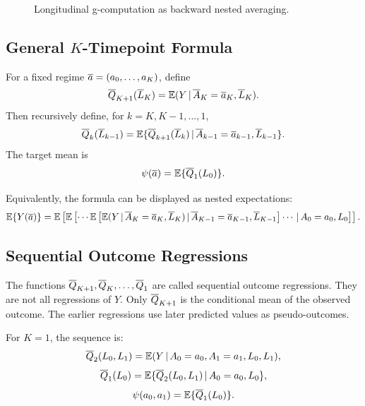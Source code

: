 \begin{figure}[H]
\centering
{}
\caption{Longitudinal g-computation as backward nested averaging.}
\label{fig:ch8-gcomp-nesting}
\end{figure}

\subsection{General $K$-Timepoint Formula}

For a fixed regime $\overline{a}=(a_0,\ldots,a_K)$, define
\[
  \overline{Q}_{K+1}(\overline{L}_K)
  =
  \mathbb{E}(Y\,\vert\, \overline{A}_K=\overline{a}_K,\overline{L}_K).
\]
Then recursively define, for $k=K,K-1,\ldots,1$,
\[
  \overline{Q}_k(\overline{L}_{k-1})
  =
  \mathbb{E}\{\overline{Q}_{k+1}(\overline{L}_k)
    \,\vert\, \overline{A}_{k-1}=\overline{a}_{k-1},\overline{L}_{k-1}\}.
\]
The target mean is
\[
  \psi(\overline{a})=\mathbb{E}\{\overline{Q}_1(L_0)\}.
\]

Equivalently, the formula can be displayed as nested expectations:
\[
  \mathbb{E}\{Y(\overline{a})\}
  =
  \mathbb{E}\left[
  \mathbb{E}\left[
  \cdots
  \mathbb{E}\left[
  \mathbb{E}(Y\,\vert\, \overline{A}_K=\overline{a}_K,\overline{L}_K)
  \,\vert\, \overline{A}_{K-1}=\overline{a}_{K-1},\overline{L}_{K-1}
  \right]
  \cdots
  \,\vert\, A_0=a_0,L_0
  \right]\right].
\]

\subsection{Sequential Outcome Regressions}

The functions $\overline{Q}_{K+1},\overline{Q}_K,\ldots,\overline{Q}_1$ are called sequential outcome
regressions. They are not all regressions of $Y$. Only $\overline{Q}_{K+1}$ is the
conditional mean of the observed outcome. The earlier regressions use later
predicted values as pseudo-outcomes.

For $K=1$, the sequence is:
\[
  \overline{Q}_2(L_0,L_1)=\mathbb{E}(Y\,\vert\, A_0=a_0,A_1=a_1,L_0,L_1),
\]
\[
  \overline{Q}_1(L_0)=\mathbb{E}\{\overline{Q}_2(L_0,L_1)\,\vert\, A_0=a_0,L_0\},
\]
\[
  \psi(a_0,a_1)=\mathbb{E}\{\overline{Q}_1(L_0)\}.
\]

